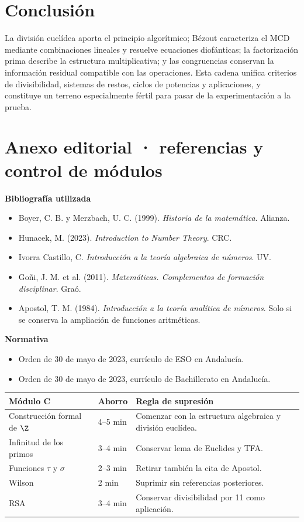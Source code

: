 \documentclass[10pt,a4paper]{article}
\begin{document}
\section{Conclusión}
La división euclídea aporta el principio algorítmico; Bézout caracteriza el MCD mediante combinaciones lineales y resuelve ecuaciones diofánticas; la factorización prima describe la estructura multiplicativa; y las congruencias conservan la información residual compatible con las operaciones. Esta cadena unifica criterios de divisibilidad, sistemas de restos, ciclos de potencias y aplicaciones, y constituye un terreno especialmente fértil para pasar de la experimentación a la prueba.

\clearpage
\section*{Anexo editorial · referencias y control de módulos}
\begin{multicols}{2}\small
\textbf{Bibliografía utilizada}
\begin{itemize}
\item Boyer, C. B. y Merzbach, U. C. (1999). \emph{Historia de la matemática}. Alianza.
\item Hunacek, M. (2023). \emph{Introduction to Number Theory}. CRC.
\item Ivorra Castillo, C. \emph{Introducción a la teoría algebraica de números}. UV.
\item Goñi, J. M. et al. (2011). \emph{Matemáticas. Complementos de formación disciplinar}. Graó.
\item Apostol, T. M. (1984). \emph{Introducción a la teoría analítica de números}. Solo si se conserva la ampliación de funciones aritméticas.
\end{itemize}
\columnbreak
\textbf{Normativa}
\begin{itemize}
\item Orden de 30 de mayo de 2023, currículo de ESO en Andalucía.
\item Orden de 30 de mayo de 2023, currículo de Bachillerato en Andalucía.
\end{itemize}
\end{multicols}

\begin{control}
\begin{tabularx}{\textwidth}{L{4.1cm}C{2.3cm}Y}
\toprule
\textbf{Módulo C} & \textbf{Ahorro} & \textbf{Regla de supresión}\\\midrule
Construcción formal de $\Z$ & 4--5 min & Comenzar con la estructura algebraica y división euclídea.\\
Infinitud de los primos & 3--4 min & Conservar lema de Euclides y TFA.\\
Funciones $\tau$ y $\sigma$ & 2--3 min & Retirar también la cita de Apostol.\\
Wilson & 2 min & Suprimir sin referencias posteriores.\\
RSA & 3--4 min & Conservar divisibilidad por 11 como aplicación.\\
\bottomrule
\end{tabularx}
\end{control}
\end{document}
